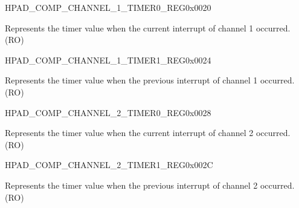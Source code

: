 \begin{register}{H}{PAD\_COMP\_CHANNEL\_1\_TIMER0\_REG}{0x0020}\label{regdesc:PADCOMPCHANNEL1TIMER0REG}
%
\regnewline%
\begin{regdesc}\begin{reglist}
\label{fielddesc:PADCOMPCHANNEL1TIMER0}\item [PAD\_COMP\_CHANNEL\_1\_TIMER0] Represents the timer value when the current interrupt of channel 1 occurred. (RO) 
\end{reglist}\end{regdesc}
\end{register}


\begin{register}{H}{PAD\_COMP\_CHANNEL\_1\_TIMER1\_REG}{0x0024}\label{regdesc:PADCOMPCHANNEL1TIMER1REG}
%
\regnewline%
\begin{regdesc}\begin{reglist}
\label{fielddesc:PADCOMPCHANNEL1TIMER1}\item [PAD\_COMP\_CHANNEL\_1\_TIMER1] Represents the timer value when the previous interrupt of channel 1 occurred. (RO)
\end{reglist}\end{regdesc}
\end{register}


\begin{register}{H}{PAD\_COMP\_CHANNEL\_2\_TIMER0\_REG}{0x0028}\label{regdesc:PADCOMPCHANNEL2TIMER0REG}
%
\regnewline%
\begin{regdesc}\begin{reglist}
\label{fielddesc:PADCOMPCHANNEL2TIMER0}\item [PAD\_COMP\_CHANNEL\_2\_TIMER0] Represents the timer value when the current interrupt of channel 2 occurred. (RO)
\end{reglist}\end{regdesc}
\end{register}


\begin{register}{H}{PAD\_COMP\_CHANNEL\_2\_TIMER1\_REG}{0x002C}\label{regdesc:PADCOMPCHANNEL2TIMER1REG}
%
\regnewline%
\begin{regdesc}\begin{reglist}
\label{fielddesc:PADCOMPCHANNEL2TIMER1}\item [PAD\_COMP\_CHANNEL\_2\_TIMER1] Represents the timer value when the previous interrupt of channel 2 occurred. (RO)
\end{reglist}\end{regdesc}
\end{register}


